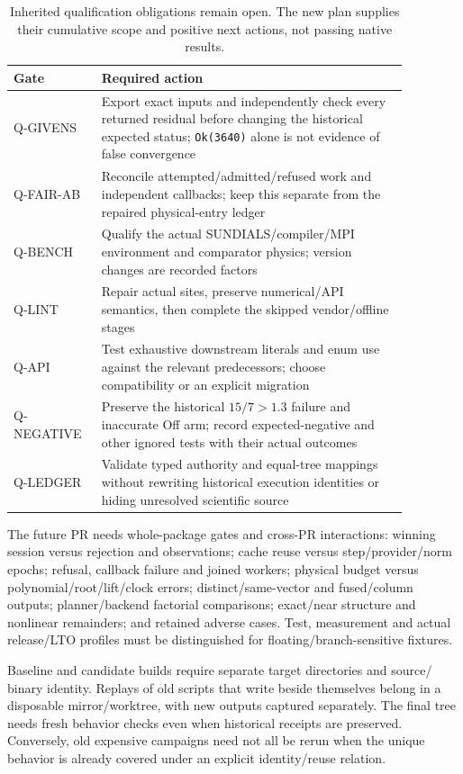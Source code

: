 \documentclass[aps,pra,reprint,onecolumn,10pt,notitlepage,nofootinbib]{revtex4-2}
\begin{document}
\begin{table}[h]
\caption{Inherited qualification obligations remain open. The new plan supplies
their cumulative scope and positive next actions, not passing native results.}
\begin{tabular}{L{0.17\linewidth}L{0.70\linewidth}}
\toprule
Gate & Required action\\
\midrule
Q-GIVENS & Export exact inputs and independently check every returned residual
before changing the historical expected status; \texttt{Ok(3640)} alone is
not evidence of false convergence\\
Q-FAIR-AB & Reconcile attempted/admitted/refused work and independent callbacks;
keep this separate from the repaired physical-entry ledger\\
Q-BENCH & Qualify the actual SUNDIALS/compiler/MPI environment and comparator
physics; version changes are recorded factors\\
Q-LINT & Repair actual sites, preserve numerical/API semantics, then complete
the skipped vendor/offline stages\\
Q-API & Test exhaustive downstream literals and enum use against the relevant
predecessors; choose compatibility or an explicit migration\\
Q-NEGATIVE & Preserve the historical $15/7>1.3$ failure and inaccurate Off arm;
record expected-negative and other ignored tests with their actual outcomes\\
Q-LEDGER & Validate typed authority and equal-tree mappings without rewriting
historical execution identities or hiding unresolved scientific source\\
\bottomrule
\end{tabular}
\end{table}

The future PR needs whole-package gates and cross-PR interactions: winning
session versus rejection and observations; cache reuse versus step/provider/norm
epochs; refusal, callback failure and joined workers; physical budget versus
polynomial/root/lift/clock errors; distinct/same-vector and fused/column outputs;
planner/backend factorial comparisons; exact/near structure and nonlinear
remainders; and retained adverse cases. Test, measurement and actual release/LTO
profiles must be distinguished for floating/branch-sensitive fixtures.

Baseline and candidate builds require separate target directories and source/
binary identity. Replays of old scripts that write beside themselves belong in
a disposable mirror/worktree, with new outputs captured separately. The final
tree needs fresh behavior checks even when historical receipts are preserved.
Conversely, old expensive campaigns need not all be rerun when the unique
behavior is already covered under an explicit identity/reuse relation.
\end{document}
